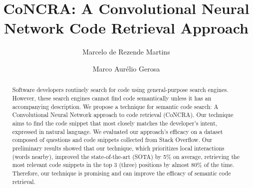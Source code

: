 \documentclass[sigconf]{acmart}
\begin{document}
\title{CoNCRA: A Convolutional Neural Network Code Retrieval Approach}

\author{Marcelo de Rezende Martins}


\author{Marco Aurélio Gerosa}



\begin{abstract}
Software developers routinely search for code using general-purpose search engines. However, these search engines cannot find code semantically unless it has an accompanying description. We propose a technique for semantic code search: A Convolutional Neural Network approach to code retrieval (CoNCRA). Our technique aims to find the code snippet that most closely matches the developer's intent, expressed in natural language. We evaluated our approach's efficacy on a dataset composed of questions and code snippets collected from Stack Overflow. Our preliminary results showed that our technique, which prioritizes local interactions (words nearby), improved the state-of-the-art (SOTA) by 5\% on average, retrieving the most relevant code snippets in the top 3 (three) positions by almost 80\% of the time. Therefore, our technique is promising and can improve the efficacy of semantic code retrieval.
\end{abstract}
\end{document}
